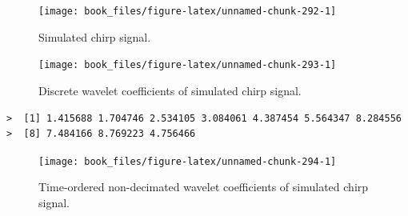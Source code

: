 \documentclass[b5paper,]{scrbook}
\makeatletter
\newenvironment{Shaded}{\begin{snugshade}}{\end{snugshade}}
\newcommand{\DataTypeTok}[1]{\textcolor[rgb]{0.13,0.29,0.53}{#1}}
\newcommand{\DecValTok}[1]{\textcolor[rgb]{0.00,0.00,0.81}{#1}}
\newcommand{\KeywordTok}[1]{\textcolor[rgb]{0.13,0.29,0.53}{\textbf{#1}}}
\newcommand{\NormalTok}[1]{#1}
\newcommand{\OperatorTok}[1]{\textcolor[rgb]{0.81,0.36,0.00}{\textbf{#1}}}
\newcommand{\StringTok}[1]{\textcolor[rgb]{0.31,0.60,0.02}{#1}}
\theoremstyle{plain}
\theoremstyle{definition}
\numberwithin{equation}{section}
\newenvironment{kframe}{%
\medskip{}
\setlength{\fboxsep}{.8em}
 \def\at@end@of@kframe{}%
 \ifinner\ifhmode%
  \def\at@end@of@kframe{\end{minipage}}%
  \begin{minipage}{\columnwidth}%
 \fi\fi%
 \def\FrameCommand##1{\hskip\@totalleftmargin \hskip-\fboxsep
 \colorbox{shadecolor}{##1}\hskip-\fboxsep
     \hskip-\linewidth \hskip-\@totalleftmargin \hskip\columnwidth}%
 \MakeFramed {\advance\hsize-\width
   \@totalleftmargin\z@ \linewidth\hsize
   \@setminipage}}%
 {\par\unskip\endMakeFramed%
 \at@end@of@kframe}
\renewenvironment{Shaded}{\begin{kframe}}{\end{kframe}}
\makeatother
\begin{document}
\begin{figure}

{\centering \texttt{[image: book\_files/figure-latex/unnamed-chunk-292-1]} 

}

\caption{Simulated chirp signal.}\label{fig:unnamed-chunk-292}
\end{figure}

\begin{Shaded}
\end{Shaded}

\begin{figure}

{\centering \texttt{[image: book\_files/figure-latex/unnamed-chunk-293-1]} 

}

\caption{Discrete wavelet coefficients of simulated chirp signal.}\label{fig:unnamed-chunk-293}
\end{figure}

\begin{verbatim}
>  [1] 1.415688 1.704746 2.534105 3.084061 4.387454 5.564347 8.284556
>  [8] 7.484166 8.769223 4.756466
\end{verbatim}

\begin{Shaded}
\end{Shaded}

\begin{figure}

{\centering \texttt{[image: book\_files/figure-latex/unnamed-chunk-294-1]} 

}

\caption{Time-ordered non-decimated wavelet coefficients of simulated chirp signal.}\label{fig:unnamed-chunk-294}
\end{figure}
\end{document}
